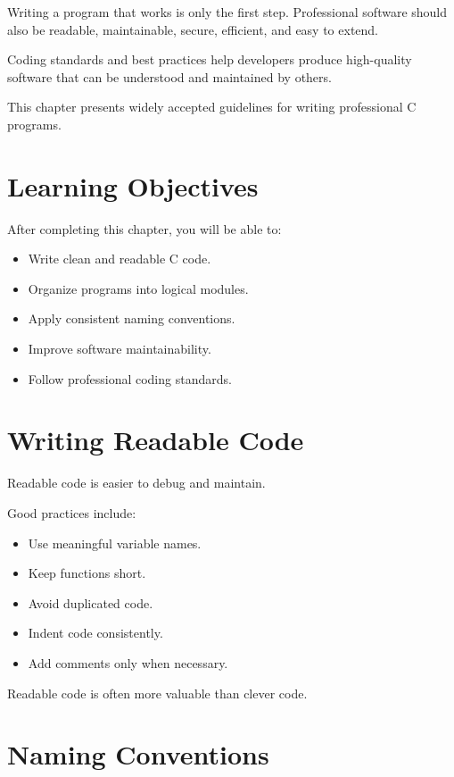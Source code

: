 \documentclass[12pt,openany]{book}
\begin{document}
Writing a program that works is only the first step. Professional software should also be readable, maintainable, secure, efficient, and easy to extend.

Coding standards and best practices help developers produce high-quality software that can be understood and maintained by others.

This chapter presents widely accepted guidelines for writing professional C programs.

\section{Learning Objectives}

After completing this chapter, you will be able to:

\begin{itemize}
    \item Write clean and readable C code.
    \item Organize programs into logical modules.
    \item Apply consistent naming conventions.
    \item Improve software maintainability.
    \item Follow professional coding standards.
\end{itemize}

\section{Writing Readable Code}

Readable code is easier to debug and maintain.

Good practices include:

\begin{itemize}
    \item Use meaningful variable names.
    \item Keep functions short.
    \item Avoid duplicated code.
    \item Indent code consistently.
    \item Add comments only when necessary.
\end{itemize}

Readable code is often more valuable than clever code.

\section{Naming Conventions}
\end{document}
